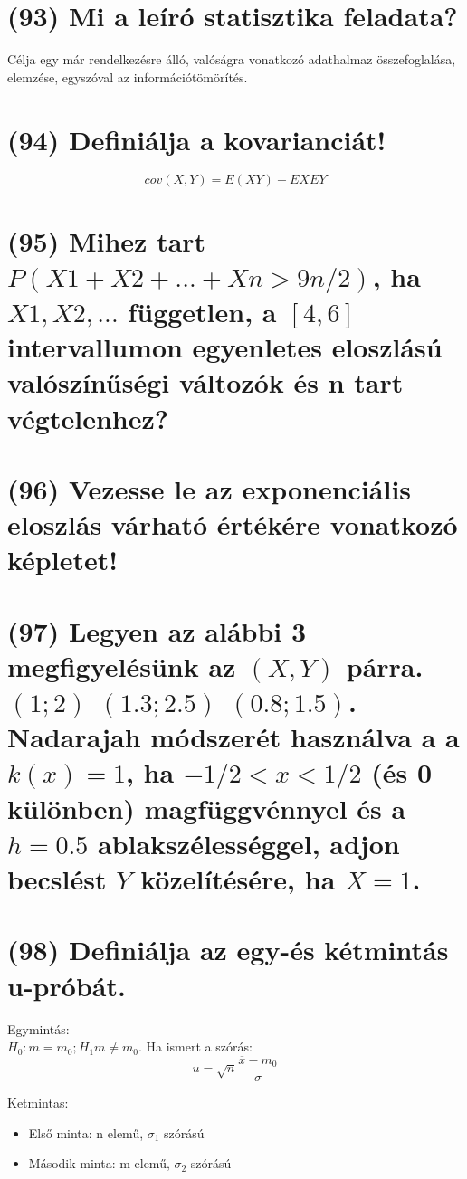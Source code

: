 \documentclass[12p]{article}
\begin{document}
\section{(93) Mi a leíró statisztika feladata?}

Célja egy már rendelkezésre álló, valóságra vonatkozó adathalmaz összefoglalása, elemzése, egyszóval az információtömörítés.\\

\section{(94) Definiálja a kovarianciát!}

$$cov(X, Y) = E(XY) - EXEY$$

\section{(95) Mihez tart $P(X1+X2+ ... +Xn > 9n/2)$, ha $X1, X2, . . .$ független, a $[4,6]$ intervallumon
egyenletes eloszlású valószínűségi változók és n tart végtelenhez?}

\section{(96) Vezesse le az exponenciális eloszlás várható értékére vonatkozó képletet!}

\section{(97) Legyen az alábbi 3 megfigyelésünk az $(X, Y)$ párra. $(1;2)$ $(1.3;2.5)$ $(0.8;1.5)$. Nadarajah
módszerét használva a a $k(x) = 1$, ha $-1/2 < x < 1/2$ (és 0 különben) magfüggvénnyel és a $h = 0.5$ ablakszélességgel, adjon becslést $Y$ közelítésére, ha $X = 1$.}

\section{(98) Definiálja az egy-és kétmintás u-próbát.}

Egymintás:\\
$H_0: m=m_0; H_1 m \neq m_0$. Ha ismert a szórás:
$$u = \sqrt{n}\frac{\overline{x} - m_0}{\sigma}$$

Ketmintas:
\begin{itemize}
	\item Első minta: n elemű, $\sigma_1$ szórású
	\item Második minta: m elemű, $\sigma_2$ szórású
\end{itemize}
\end{document}
